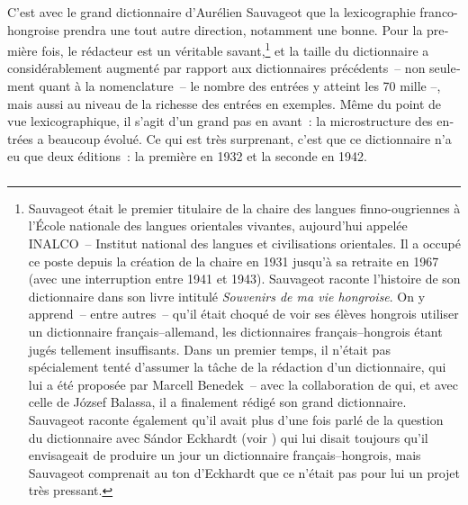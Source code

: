 \documentclass[output=paper,colorlinks,citecolor=brown,arabicfont,chinesefont,booklanguage=french]{langscibook}
\begin{document}
\begin{otherlanguage}{french}
\subsubsection{\citealt{Sauvageot1932} }\label{sec:tillinger:2.1.5}

C’est avec le grand dictionnaire d’Aurélien Sauvageot que la lexicographie franco-hongroise prendra une tout autre direction, notamment une bonne. Pour la première fois, le rédacteur est un véritable savant,\footnote{Sauvageot était le premier titulaire de la chaire des langues finno-ougriennes à l’École nationale des langues orientales vivantes, aujourd’hui appelée INALCO~-- Institut national des langues et civilisations orientales. Il a occupé ce poste depuis la création de la chaire en 1931 jusqu’à sa retraite en 1967 (avec une interruption entre 1941 et 1943). Sauvageot raconte l’histoire de son dictionnaire dans son livre intitulé \emph{Souvenirs de ma vie hongroise}. On y apprend~-- entre autres~-- qu’il était choqué de voir ses élèves hongrois utiliser un dictionnaire français–allemand, les dictionnaires français–hongrois étant jugés tellement insuffisants. Dans un premier temps, il n’était pas spécialement tenté d’assumer la tâche de la rédaction d’un dictionnaire, qui lui a été proposée par Marcell Benedek~-- avec la collaboration de qui, et avec celle de József Balassa, il a finalement rédigé son grand dictionnaire. Sauvageot raconte également qu’il avait plus d’une fois parlé de la question du dictionnaire avec Sándor Eckhardt (voir ) qui lui disait toujours qu’il envisageait de produire un jour un dictionnaire français–hongrois, mais Sauvageot comprenait au ton d’Eckhardt que ce n’était pas pour lui un projet très pressant.} et la taille du dictionnaire a considérablement augmenté par rapport aux dictionnaires précédents~-- non seulement quant à la nomenclature~-- le nombre des entrées y atteint les 70 mille –, mais aussi au niveau de la richesse des entrées en exemples. Même du point de vue lexicographique, il s’agit d’un grand pas en avant~: la microstructure des entrées a beaucoup évolué. Ce qui est très surprenant, c’est que ce dictionnaire n’a eu que deux éditions~: la première en 1932 et la seconde en 1942.

\subsubsection{\citealt{Eckhardt1953} }\label{sec:tillinger:2.1.6}


\end{otherlanguage}
\end{document}
